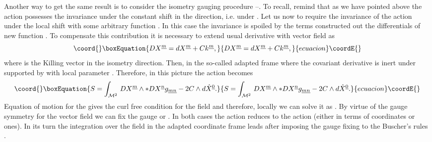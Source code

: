 \documentclass[a4paper,11pt]{article}
\begin{document}
Another way to get the same result is to consider the isometry
gauging procedure \cite{hs0}--\cite{ps}. To recall, remind that as we have 
pointed above
the action  possesses the invariance under the constant
shift in the \coordHE{} direction, i.e. under
\coordHE{}. Let us
now to require the invariance of the action under the local shift
with some arbitrary function \coordHE{}. In
this case the invariance is spoiled by the terms constructed out
the differentials of new function \coordHE{}.
To compensate this contribution it is necessary to extend usual
derivative with vector field as
\begin{equation}\coord{}\boxEquation{\plabel{DX}
DX^{\underline m}=dX^{\underline m}+Ck^{\underline m},
}{DX^{\underline m}=dX^{\underline m}+Ck^{\underline m},
}{ecuacion}\coordE{}\end{equation}
where \coordHE{} is the Killing vector in the isometry
direction. Then, in the so-called adapted frame where
\coordHE{} the covariant
derivative \coordHE{} is inert under \coordHE{} supported by \coordHE{} with local parameter 
\coordHE{}.
Therefore, in this picture the action  becomes
\begin{equation}\coord{}\boxEquation{\plabel{SD}
S=\int_{{\cal M}^2}\, DX^{\underline m}\wedge \ast DX^{\underline
n}g_{\underline {mn}}-2C\wedge d\hat{X}^{\underline 0}.
}{S=\int_{{\cal M}^2}\, DX^{\underline m}\wedge \ast DX^{\underline
n}g_{\underline {mn}}-2C\wedge d\hat{X}^{\underline 0}.
}{ecuacion}\coordE{}\end{equation}
Equation of motion for the \coordHE{} gives the curl
free condition for the field \coordHE{} and therefore, locally we can
solve it as \coordHE{}. By virtue of the gauge
symmetry for the vector field \coordHE{} we can fix the gauge \coordHE{} or
\coordHE{}. In both cases the action  reduces to
the action  (either in terms of \coordHE{} coordinates or \coordHE{} ones). In its turn the integration
over the \coordHE{} field in the adapted coordinate frame leads after
imposing the gauge fixing \coordHE{} to the Buscher's
rules .
\end{document}
